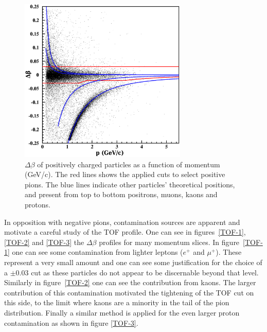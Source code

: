 \begin{figure}[tbp]
\centering
\includegraphics[width=8cm] {chap5-fig/pip_data.png} 
\caption {$\Delta \beta$ of positively charged particles as a function of momentum (GeV/c). The red lines shows the applied cuts to select positive pions. The blue lines indicate other particles' theoretical positions, and present from top to 
bottom positrons, muons, kaons and protons.}
\label{PipTOF}
\end{figure}

In opposition with negative pions, contamination sources are apparent and motivate a careful 
study of the TOF profile. One can see in figures~\ref{TOF-1}, \ref{TOF-2} and 
\ref{TOF-3} the $\Delta \beta$ profiles for many momentum slices. In figure~\ref{TOF-1}
one can see some contamination from lighter leptons ($e^+$ and $\mu^+$). These represent
a very small amount and one can see some justification for the choice of a $\pm 0.03$
cut as these particles do not appear to be discernable beyond that level. Similarly
in figure~\ref{TOF-2} one can see the contribution from kaons. The larger contribution
of this contamination motivated the tightening of the TOF cut on this side, to the limit
where kaons are a minority in the tail of the pion distribution. Finally a similar 
method is applied for the even larger proton contamination as shown in figure \ref{TOF-3}.

